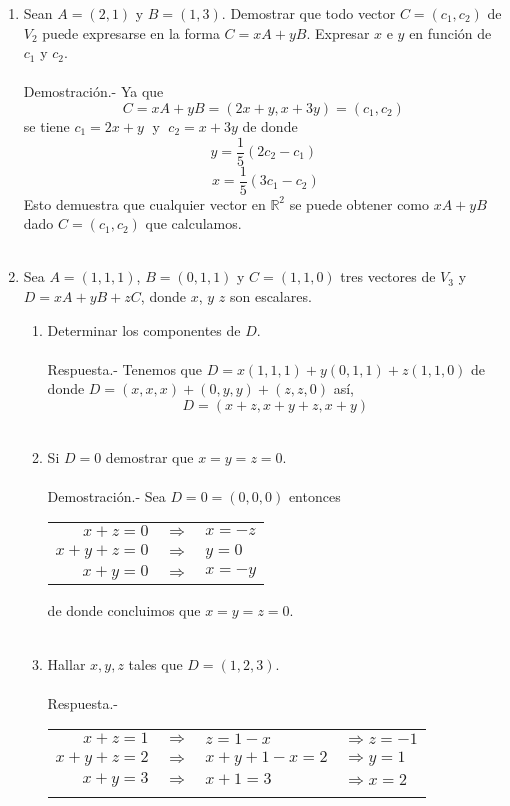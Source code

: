 \begin{enumerate}
\item Sean $A=(2,1)$ y $B=(1,3)$. Demostrar que todo vector $C=(c_1,c_2)$ de $V_2$ puede expresarse en la forma $C = xA+yB$. Expresar $x$ e $y$ en función de $c_1$ y $c_2$.\\\\
    Demostración.-\; Ya que $$C=xA+yB = (2x+y,x+3y)  = (c_1,c_2)$$
    se tiene $c_1 = 2x+y\;$ y $\;c_2 = x+3y$ de donde $$y=\dfrac{1}{5}(2c_2-c_1)$$  $$\;x=\dfrac{1}{5}(3c_1-c_2)$$
    Esto demuestra que cualquier vector en $\mathbb{R}^2$ se puede obtener como $xA+yB$ dado $C=(c_1,c_2)$ que calculamos.\\\\

\item Sea $A=(1,1,1)$, $B=(0,1,1)$ y $C=(1,1,0)$ tres vectores de $V_3$ y $D=xA+yB+zC$, donde $x$, $y$ $z$ son escalares.
\begin{enumerate}[\bfseries a)]

    \item Determinar los componentes de $D$.\\\\
	Respuesta.-\; Tenemos que $D=x(1,1,1)+y(0,1,1)+z(1,1,0)$ de donde $D=(x,x,x)+(0,y,y)+(z,z,0)$
	así, $$D=(x+z,x+y+z,x+y)$$\\

    \item Si $D=0$ demostrar que $x=y=z=0$.\\\\
	Demostración.-\; Sea $D=0=(0,0,0)$ entonces 
	\begin{center}
	    \begin{tabular}{rcl}
		$x+z=0$&$\Longrightarrow$&$x=-z$\\	
		$x+y+z=0$&$\Longrightarrow$&$y=0$\\
		$x+y=0$&$\Longrightarrow$&$x=-y$\\
	    \end{tabular}
	\end{center}
	de donde concluimos que $x=y=z=0$.\\\\

    \item Hallar $x, y, z$ tales que $D=(1,2,3)$.\\\\
	Respuesta.-\; 
	\begin{center}
	    \begin{tabular}{rcll}
		$x+z=1$&$\Longrightarrow$&$z=1-x$&$\Longrightarrow z=-1$\\
		$x+y+z=2$&$\Longrightarrow$&$x+y+1-x=2$&$\Longrightarrow y=1$\\
		$x+y=3$&$\Longrightarrow$&$x+1=3$&$\Longrightarrow x=2$\\\\
	    \end{tabular}
	\end{center}


\end{enumerate}
\end{enumerate}
